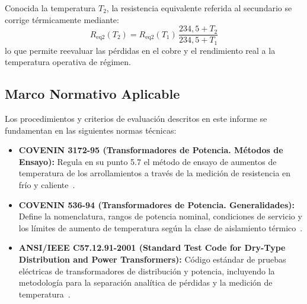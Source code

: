 Conocida la temperatura $T_2$, la resistencia equivalente referida al secundario se corrige térmicamente mediante:
\begin{equation}
    R_{\text{eq2}}(T_2) = R_{\text{eq2}}(T_1)\,\frac{234{,}5 + T_2}{234{,}5 + T_1}
    \label{eq:correccion_resistencia}
\end{equation}
lo que permite reevaluar las pérdidas en el cobre y el rendimiento real a la temperatura operativa de régimen.

\subsection{Marco Normativo Aplicable}

Los procedimientos y criterios de evaluación descritos en este informe se fundamentan en las siguientes normas técnicas:
\begin{itemize}
    \item \textbf{COVENIN 3172-95 (Transformadores de Potencia. Métodos de Ensayo):} Regula en su punto 5.7 el método de ensayo de aumentos de temperatura de los arrollamientos a través de la medición de resistencia en frío y caliente~\cite{covenin3172}.
    \item \textbf{COVENIN 536-94 (Transformadores de Potencia. Generalidades):} Define la nomenclatura, rangos de potencia nominal, condiciones de servicio y los límites de aumento de temperatura según la clase de aislamiento térmico~\cite{covenin536}.
    \item \textbf{ANSI/IEEE C57.12.91-2001 (Standard Test Code for Dry-Type Distribution and Power Transformers):} Código estándar de pruebas eléctricas de transformadores de distribución y potencia, incluyendo la metodología para la separación analítica de pérdidas y la medición de temperatura~\cite{ieee5712}.
\end{itemize}
